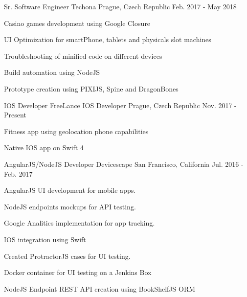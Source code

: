 \begin{cventries}
    \cventry
    {Sr. Software Engineer} %
    {Techona} %
    {Prague, Czech Republic} %
    {Feb. 2017 - May 2018} %
    {
    \begin{cvitems} %
        \item {Casino games development using Google Closure}
        \item {UI Optimization for smartPhone, tablets and physicals slot machines}
        \item {Troubleshooting of minified code on different devices}
        \item {Build automation using NodeJS}
        \item {Prototype creation using PIXIJS, Spine and DragonBones}
    \end{cvitems}
    }

    \cventry
    {IOS Developer} %
    {FreeLance IOS Developer} %
    {Prague, Czech Republic} %
    {Nov. 2017 - Present} %
    {
    \begin{cvitems} %
        \item {Fitness app using geolocation phone capabilities}
        \item {Native IOS app on Swift 4}
    \end{cvitems}
    }

    \cventry
    {AngularJS/NodeJS Developer} %
    {Devicescape} %
    {San Francisco, California} %
    {Jul. 2016 - Feb. 2017} %
    {
    \begin{cvitems} %
        \item {AngularJS UI development for mobile apps.}
        \item {NodeJS endpoints mockups for API testing.}
        \item {Google Analitics implementation for app tracking.}
        \item {IOS integration using Swift}
        \item {Created ProtractorJS cases for UI testing.}
        \item {Docker container for UI testing on a Jenkins Box}
        \item {NodeJS Endpoint REST API creation using BookShelfJS ORM}
    \end{cvitems}
    }



\end{cventries}
